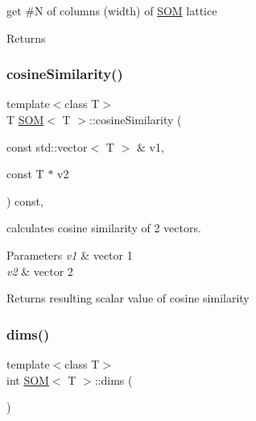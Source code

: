 get \#N of columns (width) of \mbox{\hyperlink{class_s_o_m}{S\+OM}} lattice 

\begin{DoxyReturn}{Returns}

\end{DoxyReturn}
\mbox{\label{class_s_o_m_a577f703f087e87c5d8580665540a9833}} 
\subsubsection{\texorpdfstring{cosine\+Similarity()}{cosineSimilarity()}}
{\footnotesize\ttfamily template$<$class T$>$ \\
T \mbox{\hyperlink{class_s_o_m}{S\+OM}}$<$ T $>$\+::cosine\+Similarity (\begin{DoxyParamCaption}\item[{const std\+::vector$<$ T $>$ \&}]{v1,  }\item[{const T $\ast$}]{v2 }\end{DoxyParamCaption}) const\hspace{0.3cm}{\ttfamily [inline]}, {\ttfamily [private]}}



calculates cosine similarity of 2 vectors. 


\begin{DoxyParams}{Parameters}
{\em v1} & vector 1\\
\hline
{\em v2} & vector 2\\
\hline
\end{DoxyParams}
\begin{DoxyReturn}{Returns}
resulting scalar value of cosine similarity
\end{DoxyReturn}
\mbox{\label{class_s_o_m_a82010df22b8a692601621932f4d5a389}} 
\subsubsection{\texorpdfstring{dims()}{dims()}}
{\footnotesize\ttfamily template$<$class T$>$ \\
int \mbox{\hyperlink{class_s_o_m}{S\+OM}}$<$ T $>$\+::dims (\begin{DoxyParamCaption}{ }\end{DoxyParamCaption})\hspace{0.3cm}{\ttfamily [inline]}}



